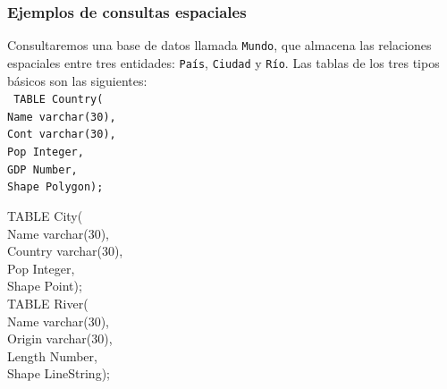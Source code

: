 \begin{frame}
		\frametitle{Ejemplos de consultas espaciales}
		Consultaremos una base de datos llamada \texttt{Mundo}, que almacena las relaciones espaciales entre tres entidades: \texttt{País}, \texttt{Ciudad} y \texttt{Río}. Las tablas de los tres tipos básicos son las siguientes: \\
		\texttt{
				TABLE Country( \\
				Name varchar(30), \\
				Cont varchar(30), \\
				Pop Integer, \\
				GDP Number, \\
				Shape Polygon);
		}

				TABLE City( \\
				Name varchar(30), \\
				Country varchar(30), \\
				Pop Integer, \\
				Shape Point); \\

				TABLE River( \\
				Name varchar(30), \\
				Origin varchar(30), \\
				Length Number, \\
				Shape LineString);


\end{frame}
